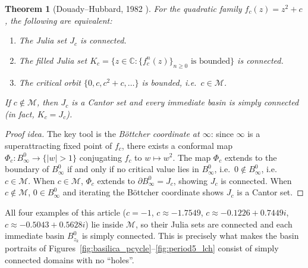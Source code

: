 \documentclass[12pt]{article}
\newtheorem{theorem}{Theorem}[section]
\theoremstyle{definition}
\newcommand{\C}{\mathbb{C}}
\begin{document}
\begin{theorem}[Douady--Hubbard, 1982 \cite{DouadyHubbard1985}]
\label{thm:connectivity}
For the quadratic family $f_c(z)=z^2+c$, the following are equivalent:
\begin{enumerate}[label=\emph{(\roman*)}]
  \item The Julia set $J_c$ is connected.
  \item The filled Julia set $K_c=\{z\in\C : \{f_c^n(z)\}_{n\ge 0}
        \text{ is bounded}\}$ is connected.
  \item The critical orbit $\{0,c,c^2+c,\ldots\}$ is bounded, i.e.\
        $c\in\mathcal{M}$.
\end{enumerate}
If $c\notin\mathcal{M}$, then $J_c$ is a Cantor set and every immediate
basin is simply connected (in fact, $K_c=J_c$).
\end{theorem}

\begin{proof}[Proof idea]
The key tool is the \emph{B\"ottcher coordinate at $\infty$}: since
$\infty$ is a superattracting fixed point of $f_c$, there exists a
conformal map $\Phi_c\colon B^0_\infty\to\{|w|>1\}$ conjugating $f_c$ to
$w\mapsto w^2$.  The map $\Phi_c$ extends to the boundary of $B^0_\infty$
if and only if no critical value lies in $B^0_\infty$, i.e.\ $0\notin
B^0_\infty$, i.e.\ $c\in\mathcal{M}$.  When $c\in\mathcal{M}$, $\Phi_c$
extends to $\partial B^0_\infty=J_c$, showing $J_c$ is connected.  When
$c\notin\mathcal{M}$, $0\in B^0_\infty$ and iterating the Böttcher coordinate
shows $J_c$ is a Cantor set.
\end{proof}

All four examples of this article ($c=-1$, $c\approx-1.7549$,
$c\approx-0.1226+0.7449i$, $c\approx-0.5043+0.5628i$) lie inside
$\mathcal{M}$, so their Julia sets are connected and each immediate basin
$B^0_{z_k}$ is simply connected.  This is precisely what makes the
basin portraits of Figures~\ref{fig:basilica_pcycle}--\ref{fig:period5_lch}
consist of simply connected domains with no ``holes''.
\end{document}
